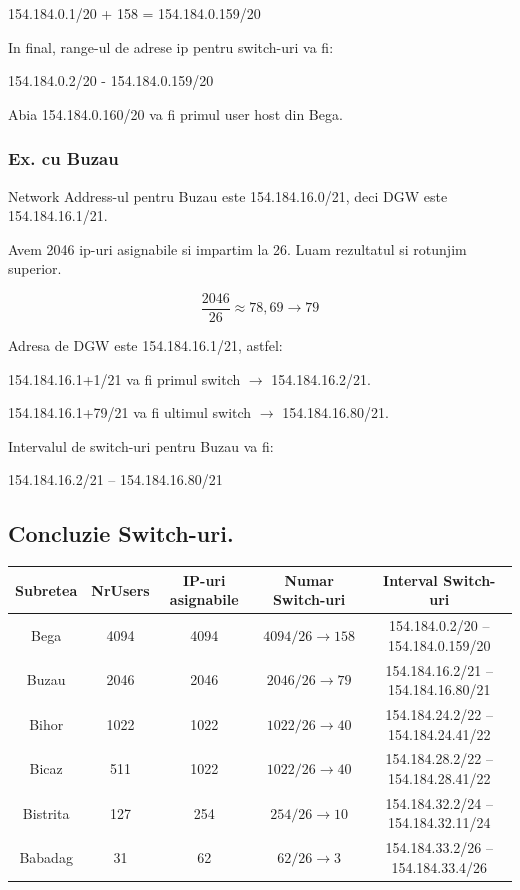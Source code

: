 \documentclass{article}
\begin{document}
\begin{center}
    154.184.0.1/20 + 158 =  154.184.0.159/20
\end{center}

In final, range-ul de adrese ip pentru switch-uri va fi:

 \begin{center}
  154.184.0.2/20 - 154.184.0.159/20
\end{center}
Abia 154.184.0.160/20 va fi primul user host din Bega.

\subsubsection{Ex. cu Buzau}
Network Address-ul pentru Buzau este 154.184.16.0/21, deci DGW este 154.184.16.1/21.

Avem 2046 ip-uri asignabile si impartim la 26. Luam rezultatul si rotunjim superior.

\[\frac{2046}{26} \approx 78{,}69 \rightarrow 79 \]

Adresa de DGW este 154.184.16.1/21, astfel:

154.184.16.1+1/21     va fi primul switch $\rightarrow$ 154.184.16.2/21.

154.184.16.1+79/21 va fi ultimul switch $\rightarrow$ 154.184.16.80/21.

Intervalul de switch-uri pentru Buzau va fi:
\begin{center}
    154.184.16.2/21 -- 154.184.16.80/21
\end{center}


\subsection{Concluzie Switch-uri.}

\begin{center}
    \begin{tabular}{||c|c|c|c|c|}
    \hline \hline
       Subretea & NrUsers & IP-uri asignabile & Numar Switch-uri & Interval Switch-uri \\
    \hline \hline
        Bega & 4094 & 4094 & $4094/26 \rightarrow 158$ & 154.184.0.2/20 -- 154.184.0.159/20\\
        \hline
        Buzau & 2046 & 2046 & $2046/26 \rightarrow 79$ & 154.184.16.2/21 -- 154.184.16.80/21\\
        \hline
        Bihor & 1022 & 1022 & $1022/26 \rightarrow 40$ & 154.184.24.2/22 -- 154.184.24.41/22\\
        \hline
        Bicaz & 511 & 1022 & $1022/26 \rightarrow 40$ & 154.184.28.2/22 -- 154.184.28.41/22\\
        \hline
        Bistrita & 127 & 254 & $254/26 \rightarrow 10$ & 154.184.32.2/24 -- 154.184.32.11/24 \\
        \hline
        Babadag & 31 & 62 & $62/26 \rightarrow 3$ & 154.184.33.2/26 -- 154.184.33.4/26\\
        \hline
    \end{tabular}
\end{center}
\end{document}
